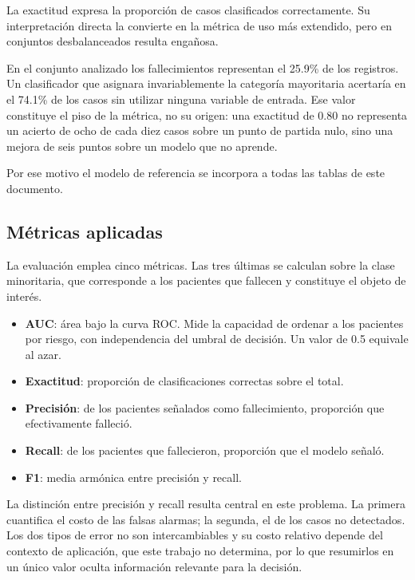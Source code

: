 \documentclass[11pt]{article}
\begin{document}
La exactitud expresa la proporción de casos clasificados correctamente. Su interpretación directa
la convierte en la métrica de uso más extendido, pero en conjuntos desbalanceados resulta
engañosa.

En el conjunto analizado los fallecimientos representan el 25.9\% de los registros. Un
clasificador que asignara invariablemente la categoría mayoritaria acertaría en el 74.1\% de los
casos sin utilizar ninguna variable de entrada. Ese valor constituye el piso de la métrica, no su
origen: una exactitud de 0.80 no representa un acierto de ocho de cada diez casos sobre un punto
de partida nulo, sino una mejora de seis puntos sobre un modelo que no aprende.

Por ese motivo el modelo de referencia se incorpora a todas las tablas de este documento.

\subsection{Métricas aplicadas}

La evaluación emplea cinco métricas. Las tres últimas se calculan sobre la clase minoritaria, que
corresponde a los pacientes que fallecen y constituye el objeto de interés.

\begin{itemize}
\item \textbf{AUC}: área bajo la curva ROC. Mide la capacidad de ordenar a los pacientes por
      riesgo, con independencia del umbral de decisión. Un valor de 0.5 equivale al azar.
\item \textbf{Exactitud}: proporción de clasificaciones correctas sobre el total.
\item \textbf{Precisión}: de los pacientes señalados como fallecimiento, proporción que
      efectivamente falleció.
\item \textbf{Recall}: de los pacientes que fallecieron, proporción que el modelo señaló.
\item \textbf{F1}: media armónica entre precisión y recall.
\end{itemize}

La distinción entre precisión y recall resulta central en este problema. La primera cuantifica el
costo de las falsas alarmas; la segunda, el de los casos no detectados. Los dos tipos de error no
son intercambiables y su costo relativo depende del contexto de aplicación, que este trabajo no
determina, por lo que resumirlos en un único valor oculta información relevante para la
decisión.
\end{document}
